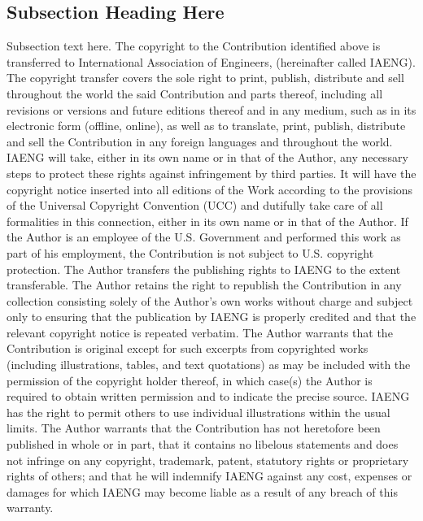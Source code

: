 \documentclass[journal]{IAENGtran}
\begin{document}


\subsection{Subsection Heading Here}
Subsection text here. The copyright to the Contribution identified
above is transferred to International Association of Engineers,
(hereinafter called IAENG). The copyright transfer covers the sole
right to print, publish, distribute and sell throughout the world
the said Contribution and parts thereof, including all revisions or
versions and future editions thereof and in any medium, such as in
its electronic form (offline, online), as well as to translate,
print, publish, distribute and sell the Contribution in any foreign
languages and throughout the world. IAENG will take, either in its
own name or in that of the Author, any necessary steps to protect
these rights against infringement by third parties. It will have the
copyright notice inserted into all editions of the Work according to
the provisions of the Universal Copyright Convention (UCC) and
dutifully take care of all formalities in this connection, either in
its own name or in that of the Author. If the Author is an employee
of the U.S. Government and performed this work as part of his
employment, the Contribution is not subject to U.S. copyright
protection. The Author transfers the publishing rights to IAENG to
the extent transferable. The Author retains the right to republish
the Contribution in any collection consisting solely of the Author's
own works without charge and subject only to ensuring that the
publication by IAENG is properly credited and that the relevant
copyright notice is repeated verbatim. The Author warrants that the
Contribution is original except for such excerpts from copyrighted
works (including illustrations, tables, and text quotations) as may
be included with the permission of the copyright holder thereof, in
which case(s) the Author is required to obtain written permission
and to indicate the precise source. IAENG has the right to permit
others to use individual illustrations within the usual limits. The
Author warrants that the Contribution has not heretofore been
published in whole or in part, that it contains no libelous
statements and does not infringe on any copyright, trademark,
patent, statutory rights or proprietary rights of others; and that
he will indemnify IAENG against any cost, expenses or damages for
which IAENG may become liable as a result of any breach of this
warranty.
\end{document}
